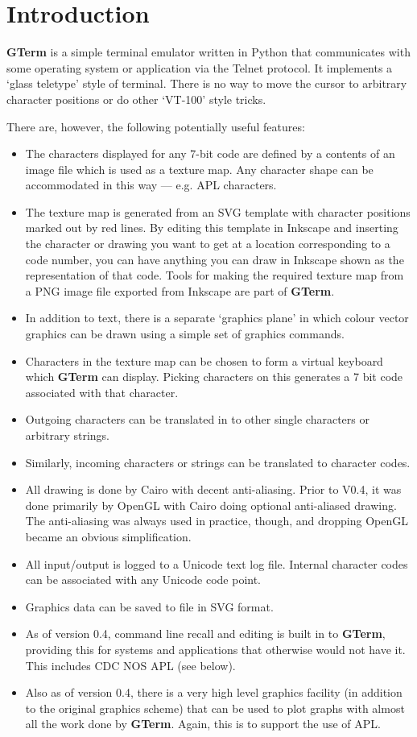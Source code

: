 \documentclass[a4paper,twoside,11pt]{article}
\newcommand{\newpara}{\par\vspace{4mm}\noindent}
\newcommand{\textbfc}[1]{\textcolor{OurRed}{#1}}
\begin{document}
\section{Introduction}
\textbf{GTerm} is a simple terminal emulator written in Python that communicates with some operating system
or application via the Telnet protocol. It implements a `glass teletype' style of terminal. There is
no way to move the cursor to arbitrary character positions or do other `VT-100' style tricks.
\newpara
There are, however, the following potentially useful features:
\begin{itemize}
\item The characters displayed for any 7-bit code are defined by a contents of an image file
      which is used as a texture map. \textbfc{Any character shape can be accommodated in this way --- e.g. APL characters}.
\item The texture map is generated from an SVG template with character positions marked out by red lines.
      By editing this template in Inkscape and inserting the character or drawing you want to get at a
      location corresponding to a code number, you can have anything you can draw in Inkscape shown as
      the representation of that code. Tools for making the required texture map from a PNG image
      file exported from Inkscape are part of \textbf{GTerm}.
\item \textbfc{In addition to text, there is a separate `graphics plane' in which colour vector graphics can
      be drawn using a simple set of graphics commands}. 
\item \textbfc{Characters in the texture map can be chosen to form a virtual keyboard which \textbf{GTerm} can display}.
      Picking characters on this generates a 7 bit code associated with that character. 
\item Outgoing characters can be translated in to other single characters or arbitrary strings.
\item Similarly, incoming characters or strings can be translated to character codes.
\item All drawing is done by Cairo with decent anti-aliasing. Prior to V0.4, it was done primarily by
	OpenGL with Cairo doing optional anti-aliased drawing. The anti-aliasing was always used in practice, though,
	and dropping OpenGL became an obvious simplification.
\item All input/output is logged to a Unicode text log file. Internal character codes can be associated
      with any Unicode code point.
\item Graphics data can be saved to file in SVG format. 
\item As of version 0.4, command line recall and editing is built in to \textbf{GTerm}, providing this for systems and
applications that otherwise would not have it. This includes CDC NOS APL (see below). 
\item Also as of version 0.4, there is a very high level graphics facility (in addition to the original graphics
scheme) that can be used to plot graphs with almost all the work done by \textbf{GTerm}. Again, this is to support
the use of APL.
\end{itemize}
\end{document}
